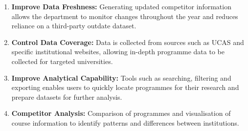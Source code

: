 \begin{enumerate}
    \item \textbf{Improve Data Freshness:} Generating updated competitor information allows the department to monitor changes throughout the year and reduces reliance on a third-party outdate dataset.
    \item \textbf{Control Data Coverage:} Data is collected from sources such as UCAS and specific institutional websites, allowing in-depth programme data to be collected for targeted universities. 
    \item \textbf{Improve Analytical Capability:} Tools such as searching, filtering and exporting enables users to quickly locate programmes for their research and prepare datasets for further analysis. 
    \item \textbf{Competitor Analysis:} Comparison of programmes and visualisation of course information to identify patterns and differences between institutions. 
\end{enumerate}

